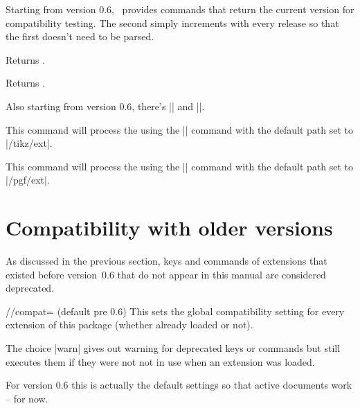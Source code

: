 \begin{multicols}{2}
Starting from version 0.6,
\tikzextname\ provides commands that return the current version for compatibility testing.
The second simply increments with every release
so that the first doesn't need to be parsed.
\begin{command}{\tikzextversion}
  Returns \texttt{\tikzextversion}.
\end{command}
\begin{command}{\tikzextversionnumber}
  Returns \texttt{\tikzextversionnumber}.
\end{command}
%
Also starting from version 0.6, there's |\tikzextset| and |\pgfextset|.
\begin{command}{\tikzextset{}}
  This command will process the  using the
  |\pgfkeys| command with the default path set to |/tikz/ext|.
\end{command}
\begin{command}{\pgfextset{}}
  This command will process the  using the
  |\pgfkeys| command with the default path set to |/pgf/ext|.
\end{command}

\newcolumn
\section{Compatibility with older versions}
As discussed in the previous section,
keys and commands of extensions that existed before version~0.6
that do not appear in this manual are considered deprecated.

\begin{key}{/\tikzext/compat= (default pre 0.6)}
  This sets the global compatibility setting for every extension of this package
  (whether already loaded or not).

  The choice |warn| gives out warning for deprecated keys or commands
  but still executes them if they were not not in use when an extension was loaded.
  
  For version 0.6 this is actually the default settings so that active documents work
  -- for now.
  

\end{key}
\end{multicols}
